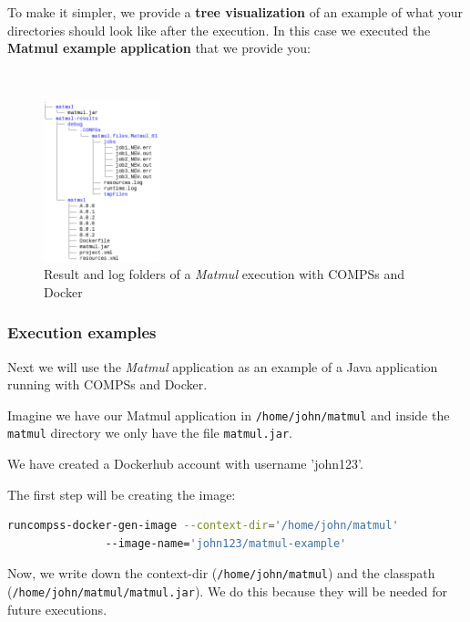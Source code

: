 To make it simpler, we provide a \textbf{tree visualization} of an example of what your directories should look like after the execution.
In this case we executed the \textbf{Matmul example application} that we provide you:

~ \newline

\begin{figure}[h!]
  \centering
    \includegraphics[width=0.3\textwidth]{./Sections/5_Execution_Platforms/Figures/docker-matmul-results-tree.png}
    \caption{Result and log folders of a \textit{Matmul} execution with COMPSs and Docker}
    \label{fig:compss_out}
\end{figure}


\clearpage
\subsubsection{Execution examples}

  Next we will use the \textit{Matmul} application as an example of a Java application running with COMPSs and Docker.

Imagine we have our Matmul application in \texttt{/home/john/matmul} and inside the \texttt{matmul} directory we only have the file \texttt{matmul.jar}.

We have created a Dockerhub account with username 'john123'.

The first step will be creating the image:
\begin{lstlisting}[language=bash]
runcompss-docker-gen-image --context-dir='/home/john/matmul'
			   --image-name='john123/matmul-example'
\end{lstlisting}

Now, we write down the context-dir (\texttt{/home/john/matmul}) and the classpath \\ (\texttt{/home/john/matmul/matmul.jar}). We do this because they will be needed for future executions. \\

